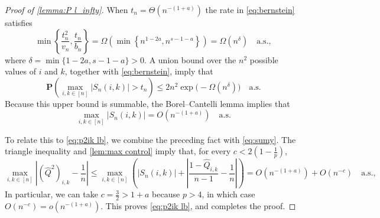 \documentclass[10pt,a4paper]{amsart}
\renewcommand{\P}{\mathbf{P}}
\newcommand\wh[1]{\widehat{#1}}
\begin{document}
\begin{proof}[Proof of \cref{lemma:P l_infty}]
When $t_n = \Theta (n^{-(1+a)})$ the rate in \cref{eq:bernstein} satisfies
\[
	\min\left\{\frac{t_n^2}{v_n}, \frac{t_n}{b_n} \right\} = \Omega \left(\min \left\{ n^{1-2a}, n^{s-1-a}\right\}\right) = \Omega (n^{\delta}) \quad \mathrm{a.s.},
\]
where $\delta = \min\{1-2a,s-1-a\}> 0$. A union bound over the $n^2$ possible values of $i$ and $k$, together with \cref{eq:bernstein}, imply that
\[
	\P \left( \max_{i,k \in [n]} |S_n (i,k)| > t_n \right) \leq 2n^2 \exp \big(- \Omega(n^\delta) \big) \quad \mathrm{a.s.}
\]
Because this upper bound is summable, the Borel--Cantelli lemma implies that
\[
	\max_{i,k \in [n]} |S_n (i,k)| = O (n^{-(1+a)}) \quad \mathrm{a.s.}
\]

To relate this to \cref{eq:p2ik lb}, we combine the preceding fact with \cref{eq:sumy}. The triangle inequality and \cref{lem:max control} imply that, for every $c < 2(1-\frac{1}{p})$,
\[
	\max_{i,k \in [n]} \left| (\wh{Q}^2)_{i,k} - \frac1n \right| \leq \max_{i,k \in [n]} \left( \left| S_n (i,k) \right| + \left| \frac{1-\wh{Q}_{i,k}}{n-1} - \frac1n \right| \right) = O (n^{-(1+a)}) + O(n^{-c}) \quad \mathrm{a.s.},
\]
In particular, we can take $c = \frac{3}{2} > 1 + a$ because $p > 4$, in which case $O(n^{-c}) = o(n^{-(1+a)})$. This proves \cref{eq:p2ik lb}, and completes the proof.
\end{proof}
\end{document}

